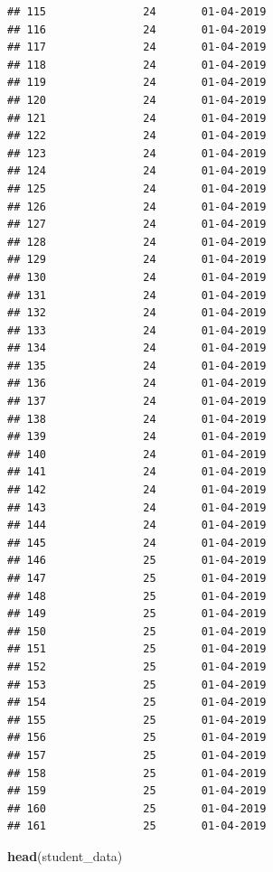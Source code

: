 \documentclass[
]{article}
\newenvironment{Shaded}{\begin{snugshade}}{\end{snugshade}}
\newcommand{\FunctionTok}[1]{\textcolor[rgb]{0.13,0.29,0.53}{\textbf{#1}}}
\newcommand{\NormalTok}[1]{#1}
\begin{document}
\begin{verbatim}
## 115               24       01-04-2019
## 116               24       01-04-2019
## 117               24       01-04-2019
## 118               24       01-04-2019
## 119               24       01-04-2019
## 120               24       01-04-2019
## 121               24       01-04-2019
## 122               24       01-04-2019
## 123               24       01-04-2019
## 124               24       01-04-2019
## 125               24       01-04-2019
## 126               24       01-04-2019
## 127               24       01-04-2019
## 128               24       01-04-2019
## 129               24       01-04-2019
## 130               24       01-04-2019
## 131               24       01-04-2019
## 132               24       01-04-2019
## 133               24       01-04-2019
## 134               24       01-04-2019
## 135               24       01-04-2019
## 136               24       01-04-2019
## 137               24       01-04-2019
## 138               24       01-04-2019
## 139               24       01-04-2019
## 140               24       01-04-2019
## 141               24       01-04-2019
## 142               24       01-04-2019
## 143               24       01-04-2019
## 144               24       01-04-2019
## 145               24       01-04-2019
## 146               25       01-04-2019
## 147               25       01-04-2019
## 148               25       01-04-2019
## 149               25       01-04-2019
## 150               25       01-04-2019
## 151               25       01-04-2019
## 152               25       01-04-2019
## 153               25       01-04-2019
## 154               25       01-04-2019
## 155               25       01-04-2019
## 156               25       01-04-2019
## 157               25       01-04-2019
## 158               25       01-04-2019
## 159               25       01-04-2019
## 160               25       01-04-2019
## 161               25       01-04-2019
\end{verbatim}

\begin{Shaded}
\begin{Highlighting}[]
\FunctionTok{head}\NormalTok{(student\_data)}
\end{Highlighting}
\end{Shaded}
\end{document}
